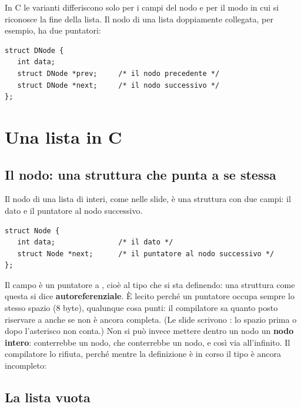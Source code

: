 In C le varianti differiscono solo per i campi del nodo e per il modo in cui
si riconosce la fine della lista. Il nodo di una lista doppiamente collegata,
per esempio, ha due puntatori:

\begin{lstlisting}[style=c]
struct DNode {
   int data;
   struct DNode *prev;     /* il nodo precedente */
   struct DNode *next;     /* il nodo successivo */
};
\end{lstlisting}

\section{Una lista in C}

\subsection{Il nodo: una struttura che punta a se stessa}

Il nodo di una lista di interi, come nelle slide, è una struttura con due
campi: il dato e il puntatore al nodo successivo.

\begin{lstlisting}[style=c]
struct Node {
   int data;               /* il dato */
   struct Node *next;      /* il puntatore al nodo successivo */
};
\end{lstlisting}

Il campo  è un puntatore a , cioè al tipo che si
sta definendo: una struttura come questa si dice
\textbf{autoreferenziale}. È lecito perché un puntatore occupa sempre lo
stesso spazio (8 byte), qualunque cosa punti: il compilatore sa quanto posto
riservare a  anche se  non è ancora completa.
(Le slide scrivono : lo spazio prima o dopo
l'asterisco non conta.) Non si può invece mettere dentro un nodo un
\textbf{nodo intero}: conterrebbe un nodo, che conterrebbe un nodo, e così
via all'infinito. Il compilatore lo rifiuta, perché mentre la definizione è
in corso il tipo è ancora incompleto:


\subsection{La lista vuota}

